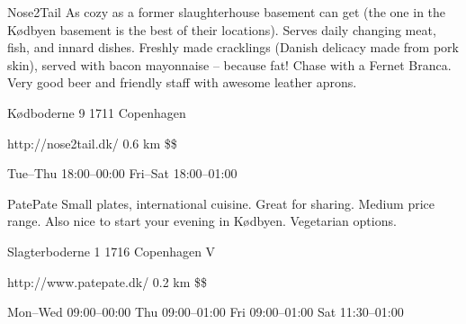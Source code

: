 \begin{fooditem}
{Nose2Tail}
{As cozy as a former slaughterhouse basement can get (the one in the Kødbyen basement is the best of their locations). Serves daily changing meat, fish, and innard dishes. Freshly made cracklings (Danish delicacy made from pork skin), served with bacon mayonnaise – because fat! Chase with a Fernet Branca. Very good beer and friendly staff with awesome leather aprons.}
{\begin{addr}
{Kødboderne 9}
{1711 Copenhagen}
\end{addr}}
{http://nose2tail.dk/}
{0.6 km}
{\$\$}
{\begin{ohours}
{Tue–Thu}
{18:00–00:00}
{Fri–Sat}
{18:00–01:00}
{}
{}
{}
{}
\end{ohours}}
\end{fooditem}
\begin{fooditem}
{PatePate}
{Small plates, international cuisine. Great for sharing. Medium price range. Also nice to start your evening in Kødbyen. Vegetarian options. }
{\begin{addr}
{Slagterboderne 1}
{1716 Copenhagen V}
\end{addr}}
{http://www.patepate.dk/}
{0.2 km}
{\$\$}
{\begin{ohours}
{Mon–Wed}
{09:00–00:00}
{Thu}
{09:00–01:00}
{Fri}
{09:00–01:00}
{Sat}
{11:30–01:00}
\end{ohours}}
\end{fooditem}

